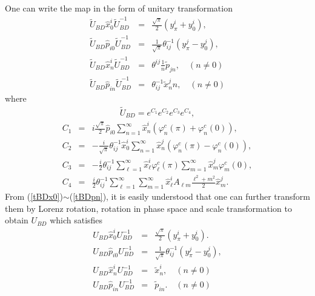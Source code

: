 \documentclass[a4paper,12pt]{article}
\newcommand{\co}{\varphi^c}
\begin{document}
One can write the map in the form of 
unitary transformation
\begin{eqnarray}
 \tilde{U}_{\scriptscriptstyle BD} \hat{x}^i_0 
\tilde{U}_{\scriptscriptstyle BD}^{-1} 
&=&
\frac{\sqrt{\pi}}{2} 
\left(y^i_\pi+ y^i_0 \right),
\label{tBDx0} \\
\tilde{U}_{\scriptscriptstyle BD} \hat{p}_{i0} 
\tilde{U}_{\scriptscriptstyle BD}^{-1}
&=&
\frac{1}{\sqrt{\pi}}\theta^{-1}_{ij}
\left(y^j_\pi- y^j_0 \right),
\label{tBDp0} \\
\tilde{U}_{\scriptscriptstyle BD} \hat{x}_n^i 
\tilde{U}_{\scriptscriptstyle BD}^{-1}
&=&\theta^{ij}  \frac{1}{n} \tilde{p}_{jn}, \quad (n \ne 0)
\label{tBDxn} \\
\tilde{U}_{\scriptscriptstyle BD} \hat{p}_{i n} 
\tilde{U}_{\scriptscriptstyle BD}^{-1}
&=&  \theta^{-1}_{ij} \tilde{x}_n^j n, \quad (n \ne 0)
\label{tBDpn}
\end{eqnarray}
where
\begin{eqnarray}
\tilde{U}_{BD} = e^{C_1}e^{C_2}e^{C_3}e^{C_4},
\end{eqnarray}
\begin{eqnarray}
C_1 &=& i \frac{\sqrt{\pi}}{2} \hat{p}_{i0}
\sum_{n=1}^\infty
\hat{x}^i_n
\left(
\co_n(\pi) + \co_n(0)
\right),
\label{C1} \\
C_2&=&
-\frac{i}{\sqrt{\pi}}
\theta^{-1}_{ij}
\hat{x}^i_{0}
\sum_{n=1}^\infty
\hat{x}^j_n
\left(
\co_n(\pi) - \co_n(0)
\right),
\label{C2} \\
C_3 &=&
-\frac{i}{2}
\theta^{-1}_{ij}
\sum_{\ell=1}^\infty \hat{x}_\ell^i \co_\ell(\pi)
\sum_{m=1}^\infty \hat{x}^j_m \co_m(0),
\label{C3}\\
C_4 &=&
\frac{i}{2}
\theta^{-1}_{ij}
\sum_{\ell = 1}^\infty
\sum_{m=1}^\infty
\hat{x}^i_\ell A_{\ell m} \frac{\ell^2+m^2}{2}
\hat{x}^j_m.
\label{C4}
\end{eqnarray}
From (\ref{tBDx0})$\sim$(\ref{tBDpn}),
it is easily understood that one can 
further transform them by
Lorenz rotation,
rotation in phase space and scale transformation
to obtain $U_{\scriptscriptstyle BD}$ which satisfies 
\begin{eqnarray}
 U_{\scriptscriptstyle BD} \hat{x}^i_0 U_{\scriptscriptstyle BD}^{-1} 
&=&
\frac{\sqrt{\pi}}{2} 
\left(y^i_\pi+ y^i_0 \right).
\label{BDx0} \\
U_{\scriptscriptstyle BD} \hat{p}_{i0} U_{\scriptscriptstyle BD}^{-1}
&=&
\frac{1}{\sqrt{\pi}}\theta^{-1}_{ij}
\left(y^j_\pi- y^j_0 \right),
\label{BDp0} \\
U_{\scriptscriptstyle BD} \hat{x}_n^i U_{\scriptscriptstyle BD}^{-1}
&=& \tilde{x}^i_n, \quad (n \ne 0)
\label{BDxn} \\
U_{\scriptscriptstyle BD} \hat{p}_{i n} U_{\scriptscriptstyle BD}^{-1}
&=&  \tilde{p}_{in}. \quad (n \ne 0)
\label{BDpn}
\end{eqnarray}
\end{document}
